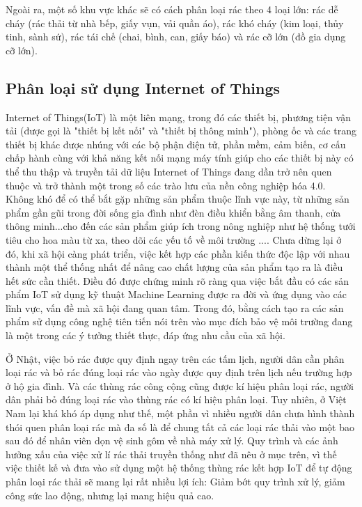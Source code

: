Ngoài ra, một số khu vực khác sẽ có cách phân loại rác theo 4 loại lớn: rác dễ cháy (rác thải từ nhà bếp, giấy vụn, vải quần áo), rác khó cháy (kim loại, thủy tinh, sành sứ), rác tái chế (chai, bình, can, giấy báo) và rác cỡ lớn (đồ gia dụng cỡ lớn).

\subsection{Phân loại sử dụng Internet of Things}
Internet of Things(IoT) là một liên mạng, trong đó các thiết bị, phương tiện vận tải (được gọi là "thiết bị kết nối" và "thiết bị thông minh"), phòng ốc và các trang thiết bị khác được nhúng với các bộ phận điện tử, phần mềm, cảm biến, cơ cấu chấp hành cùng với khả năng kết nối mạng máy tính giúp cho các thiết bị này có thể thu thập và truyền tải dữ liệu
Internet of Things đang dần trở nên quen thuộc và trở thành một trong số các trào lưu của nền công nghiệp hóa 4.0.
Không khó để có thể bắt gặp những sản phẩm thuộc lĩnh vực này, từ những sản phẩm gần gũi trong đời sống gia đình như đèn điều khiển bằng âm thanh, cửa thông minh...cho đến các sản phẩm giúp ích trong nông nghiệp như hệ thống tưới tiêu cho hoa màu từ xa, theo dõi các yếu tố về môi trường .... 
Chưa dừng lại ở đó, khi xã hội càng phát triển, việc kết hợp các phần kiến thức độc lập với nhau thành một thể thống nhất để nâng cao chất lượng của sản phẩm tạo ra là điều hết sức cần thiết.
Điều đó được chứng minh rõ ràng qua việc bắt đầu có các sản phẩm IoT sử dụng kỹ thuật Machine Learning được ra đời và ứng dụng vào các lĩnh vực, vấn đề mà xã hội đang quan tâm.
Trong đó, bằng cách tạo ra các sản phẩm sử dụng công nghệ tiên tiến nói trên vào mục đích bảo vệ môi trường đang là một trong các ý tưởng thiết thực, đáp ứng nhu cầu của xã hội.

Ở Nhật, việc bỏ rác được quy định ngay trên các tấm lịch, người dân cần phân loại rác và bỏ rác đúng loại rác vào ngày được quy định trên lịch nếu trường hợp ở hộ gia đình. Và các thùng rác công cộng cũng được kí hiệu phân loại rác, người dân phải bỏ đúng loại rác vào thùng rác có kí hiệu phân loại. Tuy nhiên, ở Việt Nam lại khá khó áp dụng như thế, một phần vì nhiều người dân chưa hình thành thói quen phân loại rác mà đa số là để chung tất cả các loại rác thải vào một bao sau đó để nhân viên dọn vệ sinh gôm về nhà máy xử lý. Quy trình và các ảnh hưởng xấu của việc xử lí rác thải truyền thống như đã nêu ở mục trên, vì thế việc thiết kế và đưa vào sử dụng một hệ thống thùng rác kết hợp IoT để tự động phân loại rác thải sẽ mang lại rất nhiều lợi ích: Giảm bớt quy trình xử lý, giảm công sức lao động, nhưng lại mang hiệu quả cao.



